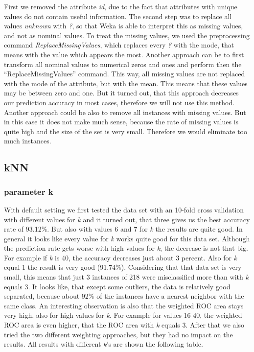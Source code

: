 \documentclass{article}
\begin{document}
First we removed the attribute \emph{id}, due to the fact that attributes with unique values do not contain useful information. The second step was to replace all values \emph{unknown} with \emph{?}, so that Weka is able to interpret this as missing values, and not as nominal values. To treat the missing values, we used the preprocessing command \emph{ReplaceMissingValues}, which replaces every \emph{?} with the mode, that means with the value which appears the most.
Another approach can be to first transform all nominal values to numerical zeros and ones and perform then the “ReplaceMissingValues” command. This way, all missing values are not replaced with the mode of the attribute, but with the mean. This means that these values may be between zero and one. But it turned out, that this approach decreases our prediction accuracy in most cases, therefore we will not use this method.
Another approach could be also to remove all instances with missing values. But in this case it does not make much sense, because the rate of missing values is quite high and the size of the set is very small. Therefore we would eliminate too much instances. 
 

\subsection{kNN}
 

\subsubsection{parameter k}
 
With default setting we first tested the data set with an 10-fold cross validation with different values for \emph{k} and it turned out, that three gives us the best accuracy rate of 93.12\%. But also with values 6 and 7 for \emph{k} the results are quite good. In general it looks like every value for \emph{k} works quite good for this data set. Although the prediction rate gets worse with high values for \emph{k}, the decrease is not that big. For example if \emph{k} is 40, the accuracy decreases just about 3 percent. Also for \emph{k} equal 1 the result is very good (91.74\%). Considering that that data set is very small, this means that just 3 instances of 218 were misclassified more than with \emph{k} equals 3. It looks like, that except some outliers, the data is relatively good separated, because about 92\% of the instances have a nearest neighbor with the same class. An interesting observation is also that the weighted ROC area stays very high, also for high values for \emph{k}. For example for values 16-40, the weighted ROC area is even higher, that the ROC area with \emph{k} equals 3. After that we also tried the two different weighting approaches, but they had no impact on the results. All results with different \emph{k}'s are shown the following table.
 
\end{document}
